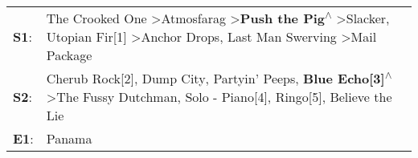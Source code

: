 \begin{supertabular}{p{0.03\textwidth}p{0.92\textwidth}}
 \textbf{S1}:  &  The Crooked One\textsuperscript{} \textgreater \enspace Atmosfarag\textsuperscript{} \textgreater \enspace \textbf{Push the Pig\textsuperscript{$\wedge$}} \textgreater \enspace Slacker\textsuperscript{}, \enspace Utopian Fir[1]\textsuperscript{} \textgreater \enspace Anchor Drops\textsuperscript{}, \enspace Last Man Swerving\textsuperscript{} \textgreater \enspace Mail Package\textsuperscript{}  \enspace  \\
 \textbf{S2}:  &                                            Cherub Rock[2]\textsuperscript{}, \enspace Dump City\textsuperscript{}, \enspace Partyin' Peeps\textsuperscript{}, \enspace \textbf{Blue Echo[3]\textsuperscript{$\wedge$}} \textgreater \enspace The Fussy Dutchman\textsuperscript{}, \enspace Solo - Piano[4]\textsuperscript{}, \enspace Ringo[5]\textsuperscript{}, \enspace Believe the Lie\textsuperscript{}  \enspace  \\
 \textbf{E1}:  &                                                                                                                                                                                                                                                                                                                                                                                       Panama\textsuperscript{}  \enspace  \\
\end{supertabular}

